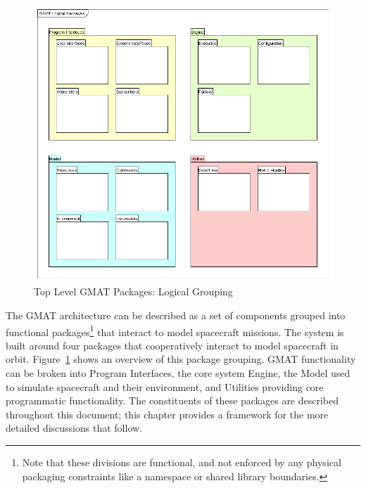 \begin{figure}
\begin{center}
\includegraphics[400,371]{Images/GMATLogicalPackages.png}
\caption{\label{figure:TopLevelPackages}Top Level GMAT Packages: Logical Grouping}
\end{center}
\end{figure}


The GMAT architecture can be described as a set of components grouped into functional
packages\footnote{Note that these divisions are functional, and not enforced by any physical
packaging constraints like a namespace or shared library boundaries.} that interact to model
spacecraft missions.  The system is built around four packages that cooperatively interact to
model spacecraft in orbit. Figure~\ref{figure:TopLevelPackages} shows an overview of this package
grouping.  GMAT functionality can be broken into Program Interfaces, the core system Engine, the
Model used to simulate spacecraft and their environment, and Utilities providing core programmatic
functionality. The constituents of these packages are described throughout this document; this
chapter provides a framework for the more detailed discussions that follow.

